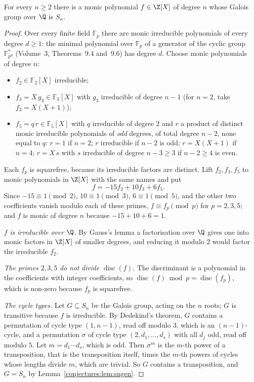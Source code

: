 \begin{theorem}\label{conjectures:thm:sn}
For every $n\ge2$ there is a monic polynomial $f\in\Z[X]$ of degree $n$ whose Galois group over $\Q$ is $S_n$.
\end{theorem}
\begin{proof}
Over every finite field $\mathbb F_p$ there are monic irreducible polynomials of every degree $d\ge1$: the minimal polynomial over $\mathbb F_p$ of a generator
of the cyclic group $\mathbb F_{p^d}^*$ (Volume~3, Theorems~9.4 and~9.6) has degree $d$. Choose monic polynomials of degree $n$:
\begin{itemize}
\item $f_2\in\mathbb F_2[X]$ irreducible;
\item $f_3=X\,g_3\in\mathbb F_3[X]$ with $g_3$ irreducible of degree $n-1$ (for $n=2$, take $f_3=X(X+1)$);
\item $f_5=q\,r\in\mathbb F_5[X]$ with $q$ irreducible of degree $2$ and $r$ a product of distinct monic irreducible polynomials of \emph{odd} degrees, of
total degree $n-2$, none equal to $q$: $r=1$ if $n=2$; $r$ irreducible if $n-2$ is odd; $r=X(X+1)$ if $n=4$; $r=X\,s$ with $s$ irreducible of degree
$n-3\ge3$ if $n-2\ge4$ is even.
\end{itemize}
Each $f_p$ is squarefree, because its irreducible factors are distinct. Lift $f_2,f_3,f_5$ to monic polynomials in $\Z[X]$ with the same names and put
\[
f=-15f_2+10f_3+6f_5.
\]
Since $-15\equiv1\pmod2$, $10\equiv1\pmod3$, $6\equiv1\pmod5$, and the other two coefficients vanish modulo each of these primes, $f\equiv f_p\pmod p$ for
$p=2,3,5$; and $f$ is monic of degree $n$ because $-15+10+6=1$.

\emph{$f$ is irreducible over $\Q$.} By Gauss's lemma a factorisation over $\Q$ gives one into monic factors in $\Z[X]$ of smaller degrees, and reducing it
modulo $2$ would factor the irreducible $f_2$.

\emph{The primes $2,3,5$ do not divide $\operatorname{disc}(f)$.} The discriminant is a polynomial in the coefficients with integer coefficients, so
$\operatorname{disc}(f)\bmod p=\operatorname{disc}(f_p)$, which is non-zero because $f_p$ is squarefree.

\emph{The cycle types.} Let $G\subseteq S_n$ be the Galois group, acting on the $n$ roots; $G$ is transitive because $f$ is irreducible. By Dedekind's
theorem, $G$ contains a permutation of cycle type $(1,n-1)$, read off modulo $3$, which is an $(n-1)$-cycle, and a permutation $\sigma$ of cycle type
$(2,d_1,\dots,d_s)$ with all $d_j$ odd, read off modulo $5$. Let $m=d_1\cdots d_s$, which is odd. Then $\sigma^m$ is the $m$-th power of a
transposition, that is the transposition itself, times the $m$-th powers of cycles whose lengths divide $m$, which are trivial. So $G$ contains a
transposition, and $G=S_n$ by Lemma~\ref{conjectures:lem:sngen}.
\end{proof}

